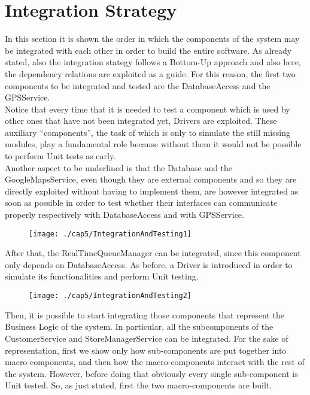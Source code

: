 \section{Integration Strategy}
In this section it is shown the order in which the components of the system may be integrated with each other in order to build the entire software.
As already stated, also the integration stategy follows a Bottom-Up approach and also here, the dependency relations are exploited as a guide.
For this reason, the first two components to be integrated and tested are the DatabaseAccess and the GPSService. \\
Notice that every time that it is needed to test a component which is used by other ones that have not been integrated yet, Drivers are exploited. These auxiliary “components”, the task of which is only to simulate the still missing modules, play a fundamental role because without them it would not be possible to perform Unit tests as early. \\
Another aspect to be underlined is that the Database and the GoogleMapsService, even though they are external components and so they are directly exploited without having to implement them, are however integrated as soon as possible in order to test whether their interfaces can communicate properly respectively with DatabaseAccess and with GPSService. \\
\begin{figure}[H]
\centerline{\texttt{[image: ./cap5/IntegrationAndTesting1]}}
\end{figure}
After that, the RealTimeQueueManager can be integrated, since this component only depends on DatabaseAccess. As before, a Driver is introduced in order to simulate its functionalities and perform Unit testing. \\
\begin{figure}[H]
\centerline{\texttt{[image: ./cap5/IntegrationAndTesting2]}}
\end{figure}
Then, it is possible to start integrating those components that represent the Business Logic of the system. In particular, all the subcomponents of the CustomerService and StoreManagerService can be integrated. For the sake of representation, first we show only how sub-components are put together into macro-components, and then how the macro-components interact with the rest of the system. However, before doing that obviously every single sub-component is Unit tested.
So, as just stated, first the two macro-components are built. \\
